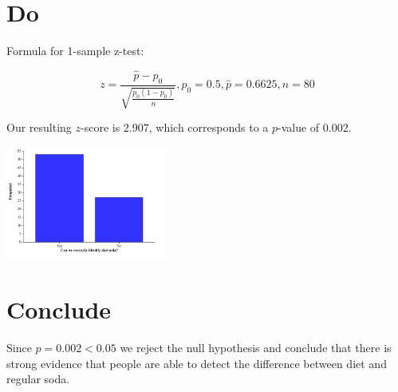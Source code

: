 \documentclass{scrreprt} %
\begin{document}
\section{Do}

Formula for 1-sample z-test:

$$
z=\frac{\hat{p}-p_0}{\sqrt{\frac{p_0(1-p_0)}{n}}}, p_0 = 0.5, \hat{p} = 0.6625, n = 80
$$

Our resulting $z$-score is 2.907, which corresponds to a $p$-value of 0.002.

\begin{center}
\includegraphics[width=200px]{2021-08-31-11-24-27.png}
\end{center}

\newpage

\section{Conclude}

Since $p = 0.002 < 0.05$ we reject the null hypothesis and conclude that there
is strong evidence that people are able to detect the difference between diet
and regular soda.
\end{document}
